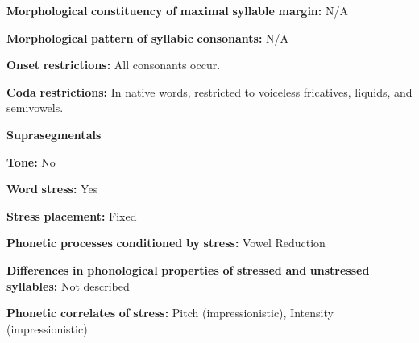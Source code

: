 \begin{styleBody}
\textbf{Morphological} \textbf{constituency} \textbf{of} \textbf{maximal} \textbf{syllable} \textbf{margin:} N/A
\end{styleBody}

\begin{styleBody}
\textbf{Morphological} \textbf{pattern} \textbf{of} \textbf{syllabic} \textbf{consonants:} N/A
\end{styleBody}

\begin{styleBody}
\textbf{Onset} \textbf{restrictions:} All consonants occur.
\end{styleBody}

\begin{styleBody}
\textbf{Coda} \textbf{restrictions:} In native words, restricted to voiceless fricatives, liquids, and semivowels.
\end{styleBody}

\begin{styleBody}
\textbf{Suprasegmentals}
\end{styleBody}

\begin{styleBody}
\textbf{Tone:} No
\end{styleBody}

\begin{styleBody}
\textbf{Word} \textbf{stress:} Yes
\end{styleBody}

\begin{styleBody}
\textbf{Stress} \textbf{placement:} Fixed
\end{styleBody}

\begin{styleBody}
\textbf{Phonetic} \textbf{processes} \textbf{conditioned} \textbf{by} \textbf{stress:} Vowel Reduction
\end{styleBody}

\begin{styleBody}
\textbf{Differences} \textbf{in} \textbf{phonological} \textbf{properties} \textbf{of} \textbf{stressed} \textbf{and} \textbf{unstressed} \textbf{syllables:} Not described
\end{styleBody}

\begin{styleBody}
\textbf{Phonetic} \textbf{correlates} \textbf{of} \textbf{stress:} Pitch (impressionistic), Intensity (impressionistic)
\end{styleBody}

